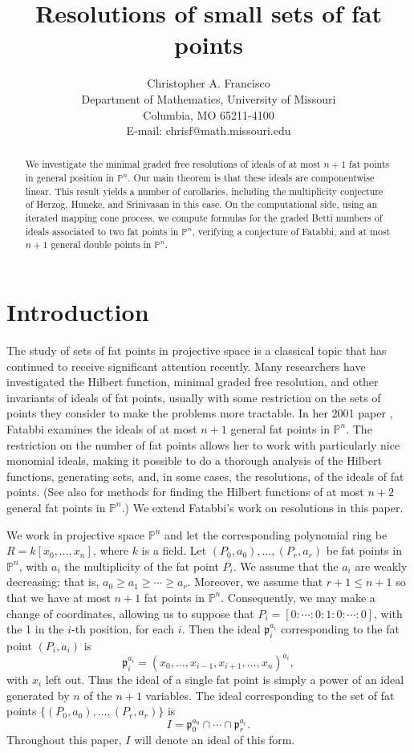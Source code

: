 \documentclass{article}
\author{Christopher A. Francisco\\Department of Mathematics, University of Missouri\\Columbia, MO 65211-4100\\E-mail: chrisf@math.missouri.edu}
\title{Resolutions of small sets of fat points}
\begin{document}
\maketitle

\begin{abstract}
We investigate the minimal graded free resolutions of ideals of at most $n+1$ fat points in general position in $\mathbb P^n$. Our main theorem is that these ideals are componentwise linear. This result yields a number of corollaries, including the multiplicity conjecture of Herzog, Huneke, and Srinivasan in this case. On the computational side, using an iterated mapping cone process, we compute formulas for the graded Betti numbers of ideals associated to two fat points in $\mathbb P^n$, verifying a conjecture of Fatabbi, and at most $n+1$ general double points in $\mathbb P^n$. 
\end{abstract}

\section[1]{Introduction}\label{s:intro}

The study of sets of fat points in projective space is a classical topic that has continued to receive significant attention recently. Many researchers have investigated the Hilbert function, minimal graded free resolution, and other invariants of ideals of fat points, usually with some restriction on the sets of points they consider to make the problems more tractable. In her 2001 paper \cite{Fatabbi}, Fatabbi examines the ideals of at most $n+1$ general fat points in $\mathbb P^n$. The restriction on the number of fat points allows her to work with particularly nice monomial ideals, making it possible to do a thorough analysis of the Hilbert functions, generating sets, and, in some cases, the resolutions, of the ideals of fat points. (See also \cite{tonyi} for methods for finding the Hilbert functions of at most $n+2$ general fat points in $\mathbb{P}^n$.) We extend Fatabbi's work on resolutions in this paper. 

We work in projective space $\mathbb P^n$ and let the corresponding polynomial ring be $R=k[x_0,\dots,x_n]$, where $k$ is a field. Let $(P_0,a_0),\dots,(P_r,a_r)$ be fat points in $\mathbb P^n$, with $a_i$ the multiplicity of the fat point $P_i$. We assume that the $a_i$ are weakly decreasing; that is, $a_0 \ge a_1 \ge \cdots \ge a_r$. Moreover, we assume that $r+1 \le n+1$ so that we have at most $n+1$ fat points in $\mathbb P^n$. Consequently, we may make a change of coordinates, allowing us to suppose that $P_i=[0:\cdots:0:1:0:\cdots:0]$, with the 1 in the $i$-th position, for each $i$. Then the ideal $\mathfrak p_i^{a_i}$ corresponding to the fat point $(P_i,a_i)$ is \[ \mathfrak p_i^{a_i} = (x_0, \dots, x_{i-1},x_{i+1}, \dots, x_n)^{a_i},\] with $x_i$ left out. Thus the ideal of a single fat point is simply a power of an ideal generated by $n$ of the $n+1$ variables. The ideal corresponding to the set of fat points $\{(P_0,a_0),\dots,(P_r,a_r)\}$ is \[ I = \mathfrak p_0^{a_0} \cap \cdots \cap \mathfrak p_r^{a_r}.\] Throughout this paper, $I$ will denote an ideal of this form.
\end{document}
